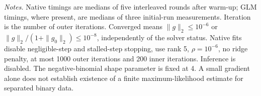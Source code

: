 \noindent\textit{Notes.} Native timings are medians of five interleaved rounds after warm-up; GLM timings, where present, are medians of three initial-run measurements. Iteration is the number of outer iterations. Converged means $\|g\|_2\leq10^{-6}$ or $\|g\|_2/(1+\|g_0\|_2)\leq10^{-8}$, independently of the solver status. Native fits disable negligible-step and stalled-step stopping, use rank 5, $\rho=10^{-6}$, no ridge penalty, at most 1000 outer iterations and 200 inner iterations. Inference is disabled.
The negative-binomial shape parameter is fixed at 4. A small gradient alone does not establish existence of a finite maximum-likelihood estimate for separated binary data.
\par
\endgroup
